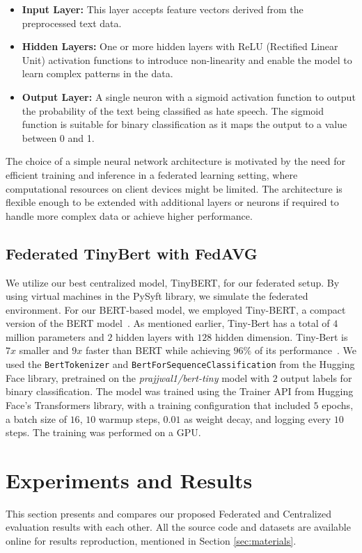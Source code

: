 \documentclass[11pt]{article}
\begin{document}
\begin{itemize}
    \item \textbf{Input Layer:} This layer accepts feature vectors derived from the preprocessed text data.
    \item \textbf{Hidden Layers:} One or more hidden layers with ReLU (Rectified Linear Unit) activation functions to introduce non-linearity and enable the model to learn complex patterns in the data.
    \item \textbf{Output Layer:} A single neuron with a sigmoid activation function to output the probability of the text being classified as hate speech. The sigmoid function is suitable for binary classification as it maps the output to a value between 0 and 1.
\end{itemize}

The choice of a simple neural network architecture is motivated by the need for efficient training and inference in a federated learning setting, where computational resources on client devices might be limited. The architecture is flexible enough to be extended with additional layers or neurons if required to handle more complex data or achieve higher performance.




\subsection{Federated TinyBert with FedAVG}
We utilize our best centralized model, TinyBERT, for our federated setup. By using virtual machines in the PySyft library, we simulate the federated environment. For our BERT-based model, we employed Tiny-BERT, a compact version of the BERT model~\cite{bhargava2021generalization, DBLP:journals/corr/abs-1908-08962}. As mentioned earlier, Tiny-Bert has a total of $4$ million parameters and $2$ hidden layers with $128$ hidden dimension. Tiny-Bert is $7x$ smaller and $9x$ faster than BERT while achieving $96\%$ of its performance~\cite{jiao2020tinybert}. We used the \texttt{BertTokenizer} and \texttt{BertForSequenceClassification} from the Hugging Face library, pretrained on the \textit{prajjwal1/bert-tiny} model with $2$ output labels for binary classification. The model was trained using the Trainer API from Hugging Face's Transformers library, with a training configuration that included $5$ epochs, a batch size of $16$, $10$ warmup steps, $0.01$ as weight decay, and logging every $10$ steps. The training was performed on a GPU.


\section{Experiments and Results}
This section presents and compares our proposed Federated and Centralized evaluation results with each other. All the source code and datasets are available online for results reproduction, mentioned in Section \ref{sec:materials}.
\end{document}
